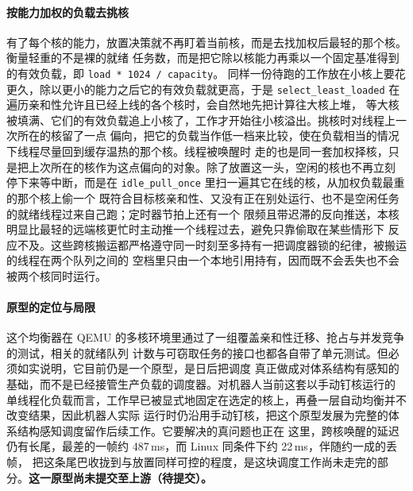 \paragraph{按能力加权的负载去挑核}
有了每个核的能力，放置决策就不再盯着当前核，而是去找加权后最轻的那个核。衡量轻重的不是裸的就绪
任务数，而是把它除以核能力再乘以一个固定基准得到的有效负载，即 \texttt{load * 1024 / capacity}。
同样一份待跑的工作放在小核上要花更久，除以更小的能力之后它的有效负载就更高，于是
\texttt{select\_least\_loaded} 在遍历亲和性允许且已经上线的各个核时，会自然地先把计算往大核上堆，
等大核被填满、它们的有效负载追上小核了，工作才开始往小核溢出。挑核时对线程上一次所在的核留了一点
偏向，把它的负载当作低一档来比较，使在负载相当的情况下线程尽量回到缓存温热的那个核。线程被唤醒时
走的也是同一套加权择核，只是把上次所在的核作为这点偏向的对象。除了放置这一头，空闲的核也不再立刻
停下来等中断，而是在 \texttt{idle\_pull\_once} 里扫一遍其它在线的核，从加权负载最重的那个核上偷一个
既符合目标核亲和性、又没有正在别处运行、也不是空闲任务的就绪线程过来自己跑；定时器节拍上还有一个
限频且带迟滞的反向推送，本核明显比最轻的远端核更忙时主动推一个线程过去，避免只靠偷取在某些情形下
反应不及。这些跨核搬运都严格遵守同一时刻至多持有一把调度器锁的纪律，被搬运的线程在两个队列之间的
空档里只由一个本地引用持有，因而既不会丢失也不会被两个核同时运行。

\paragraph{原型的定位与局限}
这个均衡器在 QEMU 的多核环境里通过了一组覆盖亲和性迁移、抢占与并发竞争的测试，相关的就绪队列
计数与可窃取任务的接口也都各自带了单元测试。但必须如实说明，它目前仍是一个原型，是日后把调度
真正做成对体系结构有感知的基础，而不是已经接管生产负载的调度器。对机器人当前这套以手动钉核运行的
单线程化负载而言，工作早已被显式地固定在选定的核上，再叠一层自动均衡并不改变结果，因此机器人实际
运行时仍沿用手动钉核，把这个原型发展为完整的体系结构感知调度留作后续工作。它要解决的真问题也正在
这里，跨核唤醒的延迟仍有长尾，最差的一帧约 487\,ms，而 Linux 同条件下约 22\,ms，伴随约一成的丢帧，
把这条尾巴收拢到与放置同样可控的程度，是这块调度工作尚未走完的部分。\textbf{这一原型尚未提交至上游（待提交）。}

